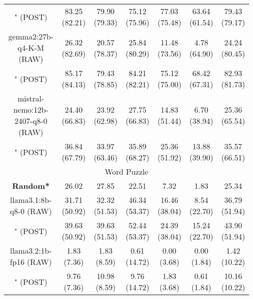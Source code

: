 \begin{table}[]
{\begin{tabular}{ccccccc}
      \multicolumn{1}{c|}{" (POST)} & 83.25 (82.21) & 79.90 (79.33) & \multicolumn{1}{c|}{75.12 (75.96)} & 77.03 (75.48) & \multicolumn{1}{c|}{63.64 (61.54)} & 79.43 (79.17) \\
      \cline{1-7}

      \multicolumn{1}{c|}{gemma2:27b-q4-K-M (RAW)} & 26.32 (82.69) & 20.57 (78.37) & \multicolumn{1}{c|}{25.84 (80.29)} & 11.48 (73.56) & \multicolumn{1}{c|}{4.78 (64.90)} & 24.24 (80.45) \\

      \multicolumn{1}{c|}{" (POST)} & 85.17 (84.13) & 79.43 (78.85) & \multicolumn{1}{c|}{84.21 (82.21)} & 75.12 (75.00) & \multicolumn{1}{c|}{68.42 (67.31)} & 82.93 (81.73) \\
      \cline{1-7}

      \multicolumn{1}{c|}{mistral-nemo:12b-2407-q8-0 (RAW)} & 24.40 (66.83) & 23.92 (62.98) & \multicolumn{1}{c|}{27.75 (66.83)} & 14.83 (51.44) & \multicolumn{1}{c|}{6.70 (38.94)} & 25.36 (65.54) \\

      \multicolumn{1}{c|}{" (POST)} & 36.84 (67.79) & 33.97 (63.46) & \multicolumn{1}{c|}{35.89 (68.27)} & 25.36 (51.92) & \multicolumn{1}{c|}{13.88 (39.90)} & 35.57 (66.51) \\
      \cline{1-7}

      \hline
      \multicolumn{7}{c}{Word Puzzle} \\ \hline
      \multicolumn{1}{c|}{\textbf{Random*}} & 26.02 & 27.85 & \multicolumn{1}{c|}{22.51} & 7.32 & \multicolumn{1}{c|}{1.83} & 25.34 \\ \hline

      \multicolumn{1}{c|}{llama3.1:8b-q8-0 (RAW)} & 31.71 (50.92) & 32.32 (51.53) & \multicolumn{1}{c|}{46.34 (53.37)} & 16.46 (38.04) & \multicolumn{1}{c|}{8.54 (22.70)} & 36.79 (51.94) \\

      \multicolumn{1}{c|}{" (POST)} & 39.63 (50.92) & 39.63 (51.53) & \multicolumn{1}{c|}{52.44 (53.37)} & 24.39 (38.04) & \multicolumn{1}{c|}{15.24 (22.70)} & 43.90 (51.94) \\
      \cline{1-7}

      \multicolumn{1}{c|}{llama3.2:1b-fp16 (RAW)} & 1.83 (7.36) & 1.83 (8.59) & \multicolumn{1}{c|}{0.61 (14.72)} & 0.00 (3.68) & \multicolumn{1}{c|}{0.00 (1.84)} & 1.42 (10.22) \\

      \multicolumn{1}{c|}{" (POST)} & 9.76 (7.36) & 10.98 (8.59) & \multicolumn{1}{c|}{9.76 (14.72)} & 1.83 (3.68) & \multicolumn{1}{c|}{0.61 (1.84)} & 10.16 (10.22) \\
      \cline{1-7}


\end{tabular}}
\end{table}
